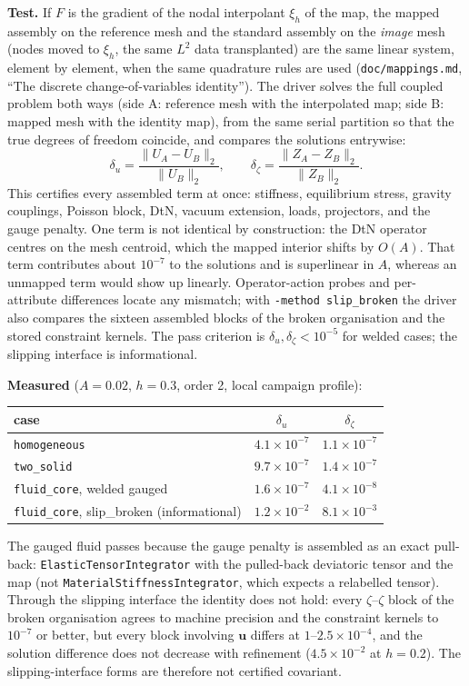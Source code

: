 \documentclass[11pt]{article}
\numberwithin{equation}{section}
\newcommand{\vu}{\mathbf{u}}
\newcommand{\code}[1]{\texttt{#1}}
\begin{document}
\textbf{Test.} If $F$ is the gradient of the nodal interpolant $\xi_h$ of
the map, the mapped assembly on the reference mesh and the standard
assembly on the \emph{image} mesh (nodes moved to $\xi_h$, the same $L^2$
data transplanted) are the same linear system, element by element, when
the same quadrature rules are used (\code{doc/mappings.md}, ``The discrete
change-of-variables identity''). The driver solves the full coupled
problem both ways (side A: reference mesh with the interpolated map; side
B: mapped mesh with the identity map), from the same serial partition so
that the true degrees of freedom coincide, and compares the solutions
entrywise:
\begin{equation}
  \delta_u = \frac{\|U_A-U_B\|_2}{\|U_B\|_2},\qquad
  \delta_\zeta = \frac{\|Z_A-Z_B\|_2}{\|Z_B\|_2}.
\end{equation}
This certifies every assembled term at once: stiffness, equilibrium
stress, gravity couplings, Poisson block, DtN, vacuum extension, loads,
projectors, and the gauge penalty. One term is not identical by
construction: the DtN operator centres on the mesh centroid, which the
mapped interior shifts by $O(A)$. That term contributes about $10^{-7}$ to
the solutions and is superlinear in $A$, whereas an unmapped term would
show up linearly. Operator-action probes and per-attribute differences
locate any mismatch; with \code{-method slip\_broken} the driver also
compares the sixteen assembled blocks of the broken organisation and the
stored constraint kernels. The pass criterion is
$\delta_u,\delta_\zeta<10^{-5}$ for welded cases; the slipping interface
is informational.

\textbf{Measured} ($A=0.02$, $h=0.3$, order 2, local campaign profile):
\begin{center}
\begin{tabular}{@{}lcc@{}}
\toprule
case & $\delta_u$ & $\delta_\zeta$ \\
\midrule
\code{homogeneous} & $4.1\times10^{-7}$ & $1.1\times10^{-7}$ \\
\code{two\_solid} & $9.7\times10^{-7}$ & $1.4\times10^{-7}$ \\
\code{fluid\_core}, welded gauged & $1.6\times10^{-7}$ & $4.1\times10^{-8}$ \\
\code{fluid\_core}, slip\_broken (informational) & $1.2\times10^{-2}$ & $8.1\times10^{-3}$ \\
\bottomrule
\end{tabular}
\end{center}
The gauged fluid passes because the gauge penalty is assembled as an
exact pull-back: \code{ElasticTensorIntegrator} with the pulled-back
deviatoric tensor and the map (not \code{MaterialStiffnessIntegrator},
which expects a relabelled tensor). Through the slipping interface the
identity does not hold: every $\zeta$--$\zeta$ block of the broken
organisation agrees to machine precision and the constraint kernels to
$10^{-7}$ or better, but every block involving $\vu$ differs at
$1$--$2.5\times10^{-4}$, and the solution difference does not decrease
with refinement ($4.5\times10^{-2}$ at $h=0.2$). The slipping-interface
forms are therefore not certified covariant.
\end{document}
